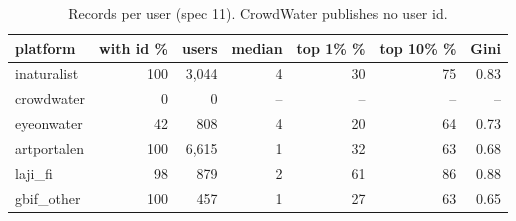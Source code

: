 \begin{table}[htbp]
\centering
\small
\caption{Records per user (spec 11). CrowdWater publishes no user id.}
\label{tab:users}
\begin{tabular}{lrrrrrr}
\toprule
platform & with id \% & users & median & top 1\% \% & top 10\% \% & Gini \\
\midrule
inaturalist & 100 & 3{,}044 & 4 & 30 & 75 & 0.83 \\
crowdwater & 0 & 0 & -- & -- & -- & -- \\
eyeonwater & 42 & 808 & 4 & 20 & 64 & 0.73 \\
artportalen & 100 & 6{,}615 & 1 & 32 & 63 & 0.68 \\
laji\_fi & 98 & 879 & 2 & 61 & 86 & 0.88 \\
gbif\_other & 100 & 457 & 1 & 27 & 63 & 0.65 \\
\bottomrule
\end{tabular}
\end{table}
